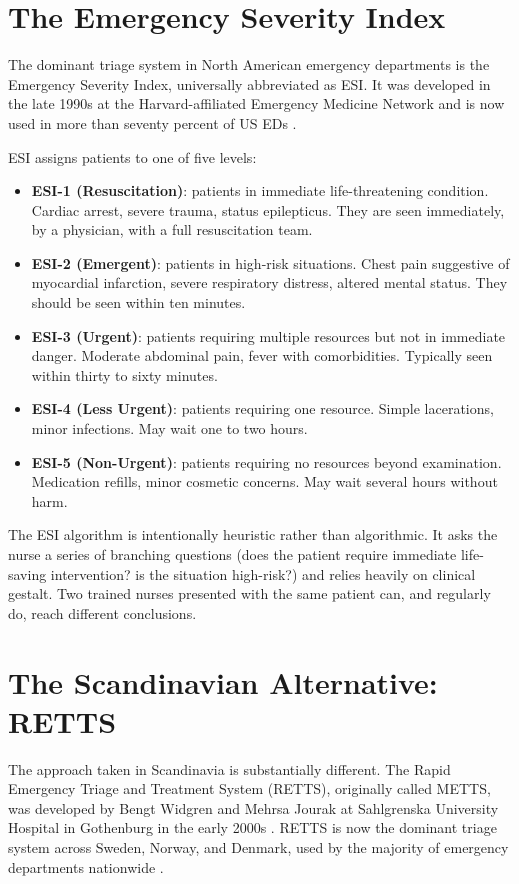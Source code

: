 \section{The Emergency Severity Index}

The dominant triage system in North American emergency departments is the Emergency Severity Index, universally abbreviated as ESI. It was developed in the late 1990s at the Harvard-affiliated Emergency Medicine Network and is now used in more than seventy percent of US EDs \citep{tanabe2004reliability}.

ESI assigns patients to one of five levels:

\begin{itemize}
 \item \textbf{ESI-1 (Resuscitation)}: patients in immediate life-threatening condition. Cardiac arrest, severe trauma, status epilepticus. They are seen immediately, by a physician, with a full resuscitation team.
 \item \textbf{ESI-2 (Emergent)}: patients in high-risk situations. Chest pain suggestive of myocardial infarction, severe respiratory distress, altered mental status. They should be seen within ten minutes.
 \item \textbf{ESI-3 (Urgent)}: patients requiring multiple resources but not in immediate danger. Moderate abdominal pain, fever with comorbidities. Typically seen within thirty to sixty minutes.
 \item \textbf{ESI-4 (Less Urgent)}: patients requiring one resource. Simple lacerations, minor infections. May wait one to two hours.
 \item \textbf{ESI-5 (Non-Urgent)}: patients requiring no resources beyond examination. Medication refills, minor cosmetic concerns. May wait several hours without harm.
\end{itemize}

The ESI algorithm is intentionally heuristic rather than algorithmic. It asks the nurse a series of branching questions (does the patient require immediate life-saving intervention? is the situation high-risk?) and relies heavily on clinical gestalt. Two trained nurses presented with the same patient can, and regularly do, reach different conclusions.

\section{The Scandinavian Alternative: RETTS}

The approach taken in Scandinavia is substantially different. The Rapid Emergency Triage and Treatment System (RETTS), originally called METTS, was developed by Bengt Widgren and Mehrsa Jourak at Sahlgrenska University Hospital in Gothenburg in the early 2000s \citep{widgren2011metts}. RETTS is now the dominant triage system across Sweden, Norway, and Denmark, used by the majority of emergency departments nationwide \citep{wireklint2021national}.

